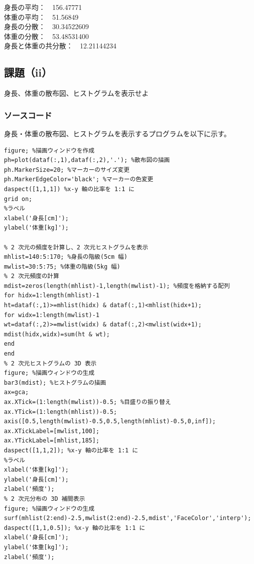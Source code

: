 \documentclass[10pt,a4paper,titlepage]{jreport} %
\begin{document}
身長の平均：　156.47771 \\
体重の平均：　51.56849 \\ 
身長の分散：　30.34522609 \\ 
体重の分散：　53.48531400 \\ 
身長と体重の共分散：　12.21144234 \\

\subsection{課題（ii）}

身長、体重の散布図、ヒストグラムを表示せよ

\subsubsection{ソースコード}

身長・体重の散布図、ヒストグラムを表示するプログラムを以下に示す。

\begin{lstlisting}[caption=身長・体重の散布図、ヒストグラムを表示するプログラム]
figure; %描画ウィンドウを作成
ph=plot(dataf(:,1),dataf(:,2),'.'); %散布図の描画
ph.MarkerSize=20; %マーカーのサイズ変更
ph.MarkerEdgeColor='black'; %マーカーの色変更
daspect([1,1,1]) %x-y 軸の比率を 1:1 に
grid on;
%ラベル
xlabel('身長[cm]');
ylabel('体重[kg]');

% 2 次元の頻度を計算し、2 次元ヒストグラムを表示
mhlist=140:5:170; %身長の階級(5cm 幅)
mwlist=30:5:75; %体重の階級(5kg 幅)
% 2 次元頻度の計算
mdist=zeros(length(mhlist)-1,length(mwlist)-1); %頻度を格納する配列
for hidx=1:length(mhlist)-1
ht=dataf(:,1)>=mhlist(hidx) & dataf(:,1)<mhlist(hidx+1);
for widx=1:length(mwlist)-1
wt=dataf(:,2)>=mwlist(widx) & dataf(:,2)<mwlist(widx+1);
mdist(hidx,widx)=sum(ht & wt);
end
end
% 2 次元ヒストグラムの 3D 表示
figure; %描画ウィンドウの生成
bar3(mdist); %ヒストグラムの描画
ax=gca;
ax.XTick=(1:length(mwlist))-0.5; %目盛りの振り替え
ax.YTick=(1:length(mhlist))-0.5;
axis([0.5,length(mwlist)-0.5,0.5,length(mhlist)-0.5,0,inf]);
ax.XTickLabel=[mwlist,100];
ax.YTickLabel=[mhlist,185];
daspect([1,1,2]); %x-y 軸の比率を 1:1 に
%ラベル
xlabel('体重[kg]');
ylabel('身長[cm]');
zlabel('頻度');
% 2 次元分布の 3D 補間表示
figure; %描画ウィンドウの生成
surf(mhlist(2:end)-2.5,mwlist(2:end)-2.5,mdist','FaceColor','interp');
daspect([1,1,0.5]); %x-y 軸の比率を 1:1 に
xlabel('身長[cm]');
ylabel('体重[kg]');
zlabel('頻度');
\end{lstlisting}
\end{document}
